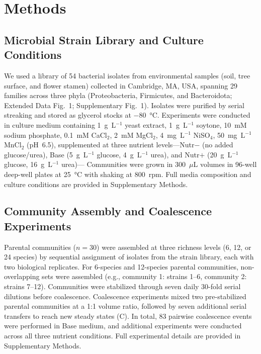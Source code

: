 \section{Methods}
\label{sec:methods}

\subsection*{Microbial Strain Library and Culture Conditions}
\label{sec:methods:strains}

We used a library of 54 bacterial isolates from environmental samples (soil, tree surface, and flower stamen) collected in Cambridge, MA, USA, spanning 29 families across three phyla (Proteobacteria, Firmicutes, and Bacteroidota; Extended Data Fig.~1; Supplementary Fig.~1). Isolates were purified by serial streaking and stored as glycerol stocks at $-80$~°C. Experiments were conducted in culture medium containing 1~g~L$^{-1}$ yeast extract, 1~g~L$^{-1}$ soytone, 10~mM sodium phosphate, 0.1~mM CaCl$_2$, 2~mM MgCl$_2$, 4~mg~L$^{-1}$ NiSO$_4$, 50~mg~L$^{-1}$ MnCl$_2$ (pH~6.5), supplemented at three nutrient levels---Nutr$-$ (no added glucose/urea), Base (5~g~L$^{-1}$ glucose, 4~g~L$^{-1}$ urea), and Nutr$+$ (20~g~L$^{-1}$ glucose, 16~g~L$^{-1}$ urea)--- Communities were grown in 300~$\mu$L volumes in 96-well deep-well plates at 25~°C with shaking at 800~rpm. Full media composition and culture conditions are provided in Supplementary Methods.


\subsection*{Community Assembly and Coalescence Experiments}
\label{sec:methods:coalescence}

Parental communities ($n = 30$) were assembled at three richness levels (6, 12, or 24 species) by sequential assignment of isolates from the strain library, each with two biological replicates. For 6-species and 12-species parental communities, non-overlapping sets were assembled (e.g., community 1: strains 1--6, community 2: strains 7--12). Communities were stabilized through seven daily 30-fold serial dilutions before coalescence. Coalescence experiments mixed two pre-stabilized parental communities at a 1:1 volume ratio, followed by seven additional serial transfers to reach new steady states (C). In total, 83 pairwise coalescence events were performed in Base medium, and additional experiments were conducted across all three nutrient conditions. Full experimental details are provided in Supplementary Methods.


